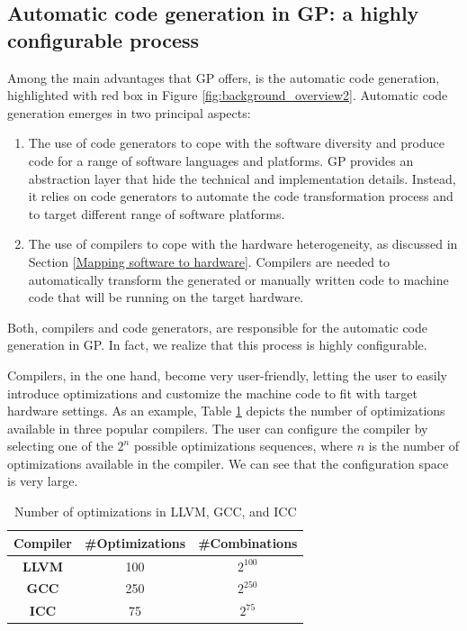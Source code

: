 \subsection{Automatic code generation in GP: a highly configurable process}
Among the main advantages that GP offers, is the automatic code generation, highlighted with red box in Figure \ref{fig:background_overview2}. Automatic code generation emerges in two principal aspects: 
\begin{enumerate}
	\item The use of code generators to cope with the software diversity and produce code for a range of software languages and platforms. GP provides an abstraction layer that hide the technical and implementation details. Instead, it relies on code generators to automate the code transformation process and to target different range of software platforms.
	\item The use of compilers to cope with the hardware heterogeneity, as discussed in Section \ref{Mapping software to hardware}. Compilers are needed to automatically transform the generated or manually written code to machine code that will be running on the target hardware.
\end{enumerate}

Both, compilers and code generators, are responsible for the automatic code generation in GP. 
In fact, we realize that this process is highly configurable. 

Compilers, in the one hand, become very user-friendly, letting the user to easily introduce optimizations and customize the machine code to fit with target hardware settings.
As an example, Table \ref{iccgccllvm} depicts the number of optimizations available in three popular compilers. The user can configure the compiler by selecting one of the $2^{n}$ possible optimizations sequences, where $n$ is the number of optimizations available in the compiler. We can see that the configuration space is very large. 

\begin{table}[h]
	\centering
	\caption{Number of optimizations in LLVM, GCC, and ICC}
	\label{my-label}
	\begin{tabular}{|c|c|c|}
		\hline
		\textbf{Compiler} & \textbf{\#Optimizations} & \textbf{\#Combinations} \\ \hline
		\textbf{LLVM}     & 100    & $2^{100}$                                 \\ \hline
		\textbf{GCC}      & 250    & $2^{250}$                                 \\ \hline
		\textbf{ICC}      & 75     & $2^{75}$                                 \\ \hline
	\end{tabular}
	\label{iccgccllvm}
\end{table}

